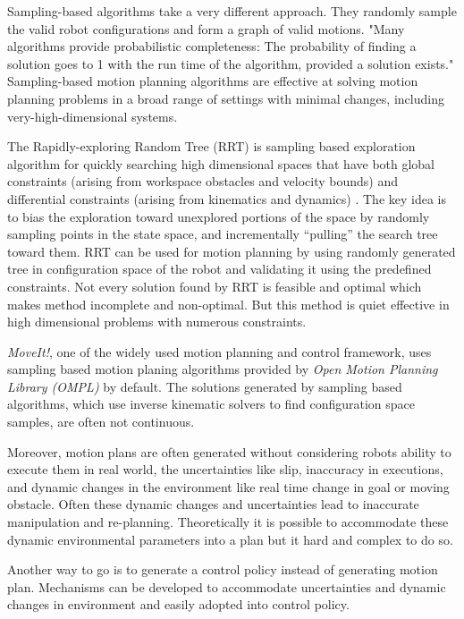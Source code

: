 Sampling-based algorithms take a very different approach. They randomly sample the valid robot configurations and form a graph of valid motions. "Many algorithms provide probabilistic completeness: The probability of finding a solution goes to 1 with the run time of the algorithm, provided a solution exists."\cite{kingston2018sampling} Sampling-based motion planning algorithms are effective at solving motion planning problems in a broad range of settings with minimal changes, including very-high-dimensional systems\cite{kingston2018sampling}. 

The Rapidly-exploring Random Tree (RRT) is sampling based exploration algorithm for quickly searching high dimensional spaces that have both global constraints (arising from workspace obstacles and velocity bounds) and differential constraints (arising from kinematics and dynamics) \cite{lavalle2003dynamic}. The key idea is to bias the exploration toward unexplored portions of the space by randomly sampling points in the state space, and incrementally “pulling” the search tree toward them. RRT can be used for motion planning by using randomly generated tree in configuration space of the robot and validating it using the predefined constraints. Not every solution found by RRT is feasible and optimal which makes method incomplete and non-optimal. But this method is quiet effective in high dimensional problems with numerous constraints. 

\textit{MoveIt!}, one of the widely used motion planning and control framework, uses sampling based motion planing algorithms provided by \textit{Open Motion Planning Library (OMPL)} by default. The solutions generated by sampling based algorithms, which use inverse kinematic solvers to find configuration space samples, are often not continuous.

Moreover, motion plans are often generated without considering robots ability to execute them in real world, the uncertainties like slip, inaccuracy in executions, and dynamic changes in the environment like real time change in goal or moving obstacle. Often these dynamic changes and uncertainties lead to inaccurate manipulation and re-planning. Theoretically it is possible to accommodate these dynamic environmental parameters into a plan but it hard and complex to do so.

 

Another way to go is to generate a control policy instead of generating motion plan. Mechanisms can be developed to accommodate uncertainties and dynamic changes in environment and easily adopted into control policy.  

